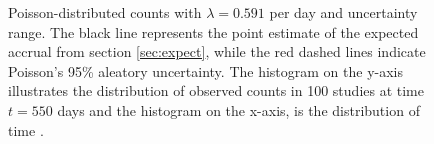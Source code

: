 \begin{figure}

  \caption{Poisson-distributed counts with $\lambda = 0.591$ per day and uncertainty range. The black line represents the point estimate of the expected accrual from section \ref{sec:expect}, while the red dashed lines indicate Poisson's 95\% aleatory uncertainty. The histogram on the y-axis illustrates the distribution of observed counts in 100 studies at time $t = 550$ days and the histogram on the x-axis, is the distribution of time \citep{spiegelhalter2011visualizing, pkgacc}.}
  \label{fig:2_13}
\end{figure}
